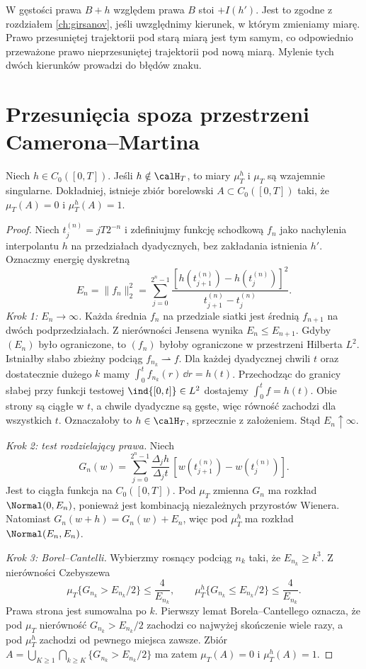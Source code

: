 \begin{uwaga}
W gęstości prawa $B+h$ względem prawa $B$ stoi
$+I(h')$. Jest to zgodne z rozdziałem \ref{ch:girsanov},
jeśli uwzględnimy kierunek, w którym zmieniamy miarę.
Prawo przesuniętej trajektorii pod starą miarą jest tym
samym, co odpowiednio przeważone prawo nieprzesuniętej
trajektorii pod nową miarą. Mylenie tych dwóch kierunków
prowadzi do błędów znaku.
\end{uwaga}

\section{Przesunięcia spoza przestrzeni Camerona--Martina}

\begin{twierdzenie}
\label{th:cm-singular}
Niech $h\in C_0([0,T])$. Jeśli $h\notin\calH_T$,
to miary $\mu_T^h$ i $\mu_T$ są wzajemnie singularne.
Dokładniej, istnieje zbiór borelowski $A\subset C_0([0,T])$
taki, że $\mu_T(A)=0$ i $\mu_T^h(A)=1$.
\end{twierdzenie}
\begin{proof}
Niech $t_j^{(n)}=jT2^{-n}$ i zdefiniujmy funkcję
schodkową $f_n$ jako nachylenia interpolantu $h$ na
przedziałach dyadycznych, bez zakładania istnienia $h'$.
Oznaczmy energię dyskretną
\[
E_n=\|f_n\|_2^2=
\sum_{j=0}^{2^n-1}\frac{[h(t_{j+1}^{(n)})-h(t_j^{(n)})]^2}
{t_{j+1}^{(n)}-t_j^{(n)}}.
\]
\emph{Krok 1: $E_n\to\infty$.} Każda średnia $f_n$ na
przedziale siatki jest średnią $f_{n+1}$ na dwóch
podprzedziałach. Z nierówności Jensena wynika
$E_n\le E_{n+1}$. Gdyby $(E_n)$ było ograniczone,
to $(f_n)$ byłoby ograniczone w przestrzeni Hilberta $L^2$.
Istniałby słabo zbieżny podciąg $f_{n_k}\rightharpoonup f$.
Dla każdej dyadycznej chwili $t$ oraz dostatecznie dużego $k$
mamy $\int_0^t f_{n_k}(r)\,\dd r=h(t)$.
Przechodząc do granicy słabej przy funkcji testowej
$\ind{[0,t]}\in L^2$ dostajemy $\int_0^t f=h(t)$.
Obie strony są ciągłe w $t$, a chwile dyadyczne są gęste,
więc równość zachodzi dla wszystkich $t$.
Oznaczałoby to $h\in\calH_T$, sprzecznie z założeniem.
Stąd $E_n\uparrow\infty$.

\emph{Krok 2: test rozdzielający prawa.} Niech
\[
G_n(w)=\sum_{j=0}^{2^n-1}\frac{\Delta_j h}{\Delta_j t}
\,[w(t_{j+1}^{(n)})-w(t_j^{(n)})].
\]
Jest to ciągła funkcja na $C_0([0,T])$.
Pod $\mu_T$ zmienna $G_n$ ma rozkład $\Normal(0,E_n)$,
ponieważ jest kombinacją niezależnych przyrostów Wienera.
Natomiast $G_n(w+h)=G_n(w)+E_n$, więc pod $\mu_T^h$
ma rozkład $\Normal(E_n,E_n)$.

\emph{Krok 3: Borel--Cantelli.} Wybierzmy rosnący podciąg
$n_k$ taki, że $E_{n_k}\ge k^3$.
Z nierówności Czebyszewa
\[
\mu_T\{G_{n_k}>E_{n_k}/2\}\le\frac4{E_{n_k}},\qquad
\mu_T^h\{G_{n_k}\le E_{n_k}/2\}\le\frac4{E_{n_k}}.
\]
Prawa strona jest sumowalna po $k$. Pierwszy lemat
Borela--Cantellego oznacza, że pod $\mu_T$ nierówność
$G_{n_k}>E_{n_k}/2$ zachodzi co najwyżej skończenie wiele razy,
a pod $\mu_T^h$ zachodzi od pewnego miejsca zawsze.
Zbiór
$A=\bigcup_{K\ge1}\bigcap_{k\ge K}\{G_{n_k}>E_{n_k}/2\}$
ma zatem $\mu_T(A)=0$ i $\mu_T^h(A)=1$.
\end{proof}

